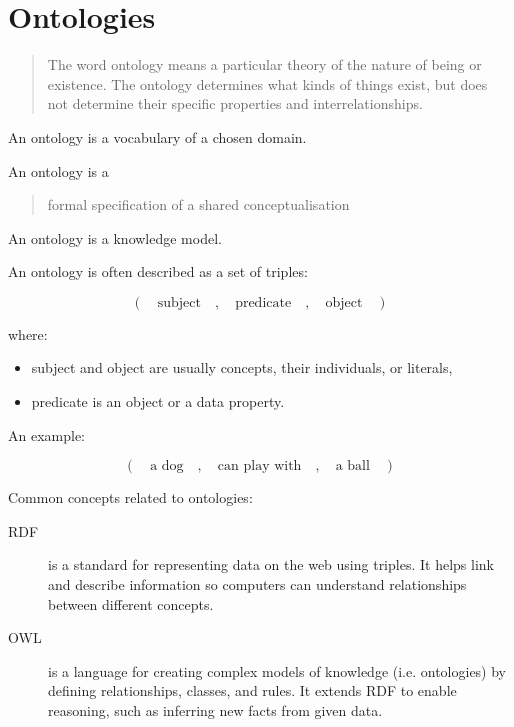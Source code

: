 \section{Ontologies}

\begin{frame}{\insertsection}
    \blockquote[{{\cite[p. 290]{russell2022ArtificialIntelligenceModern}}}]{The word ontology means a particular theory of the nature of being or existence. The ontology determines what kinds of things exist, but does not determine their specific properties and interrelationships.}
    
    \medskip
    
    An ontology is a vocabulary of a chosen domain.

    \medskip

    An ontology is a \blockquote[\cite{guarino2009WhatOntology,borst1997ConstructionEngineeringOntologies}]{formal specification of a shared conceptualisation}.

    \medskip

    An ontology is a knowledge model.
    
\end{frame}

\begin{frame}{\insertsection}
    An ontology is often described as a set of \alert{triples}:

    $$(\quad\text{subject}\quad,\quad\text{predicate}\quad,\quad\text{object}\quad)$$

    where:
    \begin{itemize}
        \item subject and object are usually \alert{concepts}, their individuals, or literals,
        
        \item predicate is an object or a data \alert{property}.
    \end{itemize}

    \medskip
    An example:

    $$(\quad\text{a dog}\quad,\quad\text{can play with}\quad,\quad\text{a ball}\quad)$$
\end{frame}

\begin{frame}{\insertsection}
    Common concepts related to ontologies:

    \begin{description}
        \item [\Ac{RDF}] is a standard for representing data on the web using triples. It helps link and describe information so computers can understand relationships between different concepts.

        \item [\Ac{OWL}] is a language for creating complex models of knowledge (i.e. ontologies) by defining relationships, classes, and rules. It extends RDF to enable reasoning, such as inferring new facts from given data.
    \end{description}
\end{frame}

